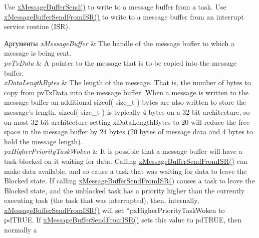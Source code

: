 \begin{DoxyPre}
\begin{DoxyPre}   Use \mbox{\hyperlink{message__buffer_8h_a858f6da6fe24a226c45caf1634ea1605}{xMessageBufferSend()}} to write to a message buffer from a task.  Use
   \mbox{\hyperlink{message__buffer_8h_aeef5b0c4f8c2db6ca2230a8874813e79}{xMessageBufferSendFromISR()}} to write to a message buffer from an interrupt
   service routine (ISR).\end{DoxyPre}
\end{DoxyPre}



\begin{DoxyPre}
\begin{DoxyPre}
\begin{DoxyParams}{Аргументы}
{\em xMessageBuffer} & The handle of the message buffer to which a message is
   being sent.\\
\hline
{\em pvTxData} & A pointer to the message that is to be copied into the
   message buffer.\\
\hline
{\em xDataLengthBytes} & The length of the message.  That is, the number of
   bytes to copy from pvTxData into the message buffer.  When a message is
   written to the message buffer an additional sizeof( size\_t ) bytes are also
   written to store the message's length.  sizeof( size\_t ) is typically 4 bytes
   on a 32-bit architecture, so on most 32-bit architecture setting
   xDataLengthBytes to 20 will reduce the free space in the message buffer by 24
   bytes (20 bytes of message data and 4 bytes to hold the message length).\\
\hline
{\em pxHigherPriorityTaskWoken} & It is possible that a message buffer will
   have a task blocked on it waiting for data.  Calling
   \mbox{\hyperlink{message__buffer_8h_aeef5b0c4f8c2db6ca2230a8874813e79}{xMessageBufferSendFromISR()}} can make data available, and so cause a task that
   was waiting for data to leave the Blocked state.  If calling
   \mbox{\hyperlink{message__buffer_8h_aeef5b0c4f8c2db6ca2230a8874813e79}{xMessageBufferSendFromISR()}} causes a task to leave the Blocked state, and the
   unblocked task has a priority higher than the currently executing task (the
   task that was interrupted), then, internally, \mbox{\hyperlink{message__buffer_8h_aeef5b0c4f8c2db6ca2230a8874813e79}{xMessageBufferSendFromISR()}}
   will set *pxHigherPriorityTaskWoken to pdTRUE.  If
   \mbox{\hyperlink{message__buffer_8h_aeef5b0c4f8c2db6ca2230a8874813e79}{xMessageBufferSendFromISR()}} sets this value to pdTRUE, then normally a

\end{DoxyParams}
\end{DoxyPre}
\end{DoxyPre}
